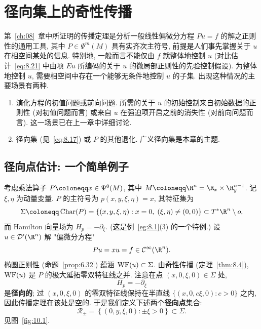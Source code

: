 

\chapter{径向集上的奇性传播}\label{ch:10}

%
%
%
第~\ref{ch:08}~章中所证明的传播定理是分析一般线性偏微分方程 $P u = f$ 的解之正则性的通用工具, 其中 $P \in \Psi^m(M)$ 具有实齐次主符号, 前提是人们事先掌握关于 $u$ 在相空间某处的信息. 特别地, 一般而言不能仅由 $f$ 就整体地控制 $u$ (对比估计~\eqref{eq:8.21} 中由项 $E u$ 所编码的关于 $u$ 的微局部正则性的先验控制假设). 为整体地控制 $u$, 需要相空间中存在一个能够无条件地控制 $u$ 的子集. 出现这种情况的主要场景有两种.

\begin{enumerate}
    \item 演化方程的初值问题或前向问题. 所需的关于 $u$ 的初始控制来自初始数据的正则性 (对初值问题而言) 或来自 $u$ 在强迫项开启之前的消失性 (对前向问题而言). 这一场景已在上一章中详细讨论.
    \item 径向集 (见~\eqref{eq:8.17}) 或 $P$ 的其他退化. 广义径向集是本章的主题.
\end{enumerate}

\section{径向点估计: 一个简单例子}\label{sec:10.1}
%

考虑乘法算子 $P \defeq x \in \Psi^0(M)$, 其中 $M \defeq \R^n = \R_x \times \R_y^{n-1}$. 记 $\xi, \eta$ 为动量变量. $P$ 的主符号为 $p(x, y, \xi, \eta) = x$, 其特征集为
\begin{equation}\label{eq:10.1}
    \Sigma \defeq \Char(P) = \left\{ (x, y, \xi, \eta) : x = 0, \; (\xi, \eta) \neq (0, 0) \right\} \subset T^* \R^n \setminus o,
\end{equation}
而 Hamilton 向量场为 $H_p = -\partial_\xi$. (这是例~\ref{eg:8.1}(3) 的一个特例.) 设 $u \in \mathcal{D}'(\R^n)$ 解 "偏微分方程"
\begin{equation}\label{eq:10.2}
    P u = x u = f \in \Smooth(\R^n).
\end{equation}
椭圆正则性 (命题~\ref{prop:6.32}) 蕴涵 $\operatorname{WF}(u) \subset \Sigma$. 由奇性传播 (定理~\ref{thm:8.4}), $\operatorname{WF}(u)$ 是 $P$ 的极大延拓零双特征线之并. 注意在点 $(x, 0, \xi, 0) \in \Sigma$ 处,
\begin{equation}\label{eq:10.3}
    H_p = -\partial_\xi
\end{equation}
是\textbf{径向的}; 过 $(x, 0, \xi, 0)$ 的零双特征线保持在半直线 $\{(x, 0, c\xi, 0) : c > 0\}$ 之内, 因此传播定理在该处是空的. 于是我们定义下述两个\textbf{径向点}集合:
\begin{equation}\label{eq:10.4}
    \mathcal{R}_\pm = \left\{ (0, y, \xi, 0) : \pm \xi > 0 \right\} \subset \Sigma.
\end{equation}
见图~\ref{fig:10.1}.

